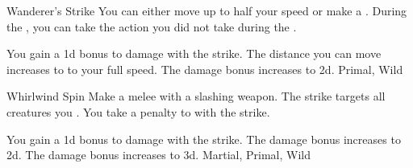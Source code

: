 \lowercase{\hypertarget{maneuver:Wanderer's Strike}{}}\label{maneuver:Wanderer's Strike}
\begin{freeability}{\hypertarget{maneuver:Wanderer's Strike}{Wanderer's Strike}}
You can either move up to half your speed or make a .
During the , you can take the action you did not take during the .

\rankline
{} You gain a \plus1d bonus to damage with the strike.
 The distance you can move increases to to your full speed.
 The damage bonus increases to \plus2d.
 Primal, Wild
\end{freeability}
\vspace{0.25em}



\lowercase{\hypertarget{maneuver:Whirlwind Spin}{}}\label{maneuver:Whirlwind Spin}
\begin{apability}{\hypertarget{maneuver:Whirlwind Spin}{Whirlwind Spin}}
Make a melee  with a slashing weapon.
The strike targets all creatures you .
You take a  penalty to  with the strike.

\rankline
{} You gain a \plus1d bonus to damage with the strike.
 The damage bonus increases to \plus2d.
 The damage bonus increases to \plus3d.
 Martial, Primal, Wild
\end{apability}
\vspace{0.25em}

